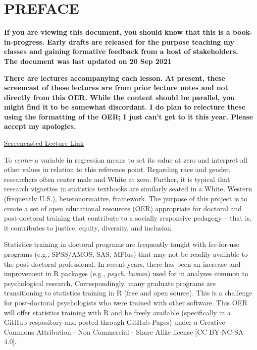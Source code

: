\documentclass[
  english,
]{book}
\begin{document}
\hypertarget{preface}{%
\chapter*{PREFACE}\label{preface}}

\textbf{If you are viewing this document, you should know that this is a book-in-progress. Early drafts are released for the purpose teaching my classes and gaining formative feedback from a host of stakeholders. The document was last updated on 20 Sep 2021}

\textbf{There are lectures accompanying each lesson. At present, these screencast of these lectures are from prior lecture notes and not directly from this OER. While the content should be parallel, you might find it to be somewhat discordant. I do plan to relecture these using the formatting of the OER; I just can't get to it this year. Please accept my apologies.}

\href{https://spu.hosted.panopto.com/Panopto/Pages/Viewer.aspx?id=c932455e-ef06-444a-bdca-acf7012d759a}{Screencasted Lecture Link}

To \emph{center} a variable in regression means to set its value at zero and interpret all other values in relation to this reference point. Regarding race and gender, researchers often center male and White at zero. Further, it is typical that research vignettes in statistics textbooks are similarly seated in a White, Western (frequently U.S.), heteronormative, framework. The purpose of this project is to create a set of open educational resources (OER) appropriate for doctoral and post-doctoral training that contribute to a socially responsive pedagogy -- that is, it contributes to justice, equity, diversity, and inclusion.

Statistics training in doctoral programs are frequently taught with fee-for-use programs (e.g., SPSS/AMOS, SAS, MPlus) that may not be readily available to the post-doctoral professional. In recent years, there has been an increase and improvement in R packages (e.g., \emph{psych}, \emph{lavaan}) used for in analyses common to psychological research. Correspondingly, many graduate programs are transitioning to statistics training in R (free and open source). This is a challenge for post-doctoral psychologists who were trained with other software. This OER will offer statistics training with R and be freely available (specifically in a GitHub respository and posted through GitHub Pages) under a Creative Commons Attribution - Non Commercial - Share Alike license {[}CC BY-NC-SA 4.0{]}.
\end{document}
